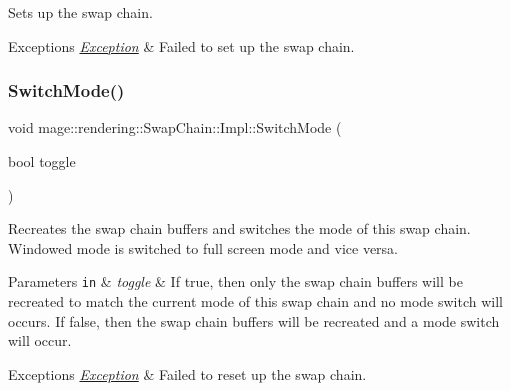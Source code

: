Sets up the swap chain.


\begin{DoxyExceptions}{Exceptions}
{\em \mbox{\hyperlink{classmage_1_1_exception}{Exception}}} & Failed to set up the swap chain. \\
\hline
\end{DoxyExceptions}
\mbox{\label{classmage_1_1rendering_1_1_swap_chain_1_1_impl_aa3c391f6651074e73105174b68025731}} 
\subsubsection{\texorpdfstring{Switch\+Mode()}{SwitchMode()}}
{\footnotesize\ttfamily void mage\+::rendering\+::\+Swap\+Chain\+::\+Impl\+::\+Switch\+Mode (\begin{DoxyParamCaption}\item[{bool}]{toggle }\end{DoxyParamCaption})}

Recreates the swap chain buffers and switches the mode of this swap chain. Windowed mode is switched to full screen mode and vice versa.


\begin{DoxyParams}[1]{Parameters}
\mbox{\tt in}  & {\em toggle} & If {\ttfamily true}, then only the swap chain buffers will be recreated to match the current mode of this swap chain and no mode switch will occurs. If {\ttfamily false}, then the swap chain buffers will be recreated and a mode switch will occur. \\
\hline
\end{DoxyParams}

\begin{DoxyExceptions}{Exceptions}
{\em \mbox{\hyperlink{classmage_1_1_exception}{Exception}}} & Failed to reset up the swap chain. \\
\hline
\end{DoxyExceptions}
\mbox{\label{classmage_1_1rendering_1_1_swap_chain_1_1_impl_abdc55ba548c3178ab3edbeeb39099a4c}} 
